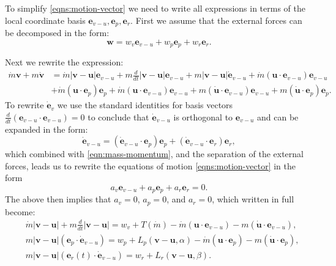 \documentclass{article}
\renewcommand{\vec}[1]{\boldsymbol{#1}}
\begin{document}
To simplify \eqref{eqns:motion-vector} we need to write all expressions in terms of the local coordinate basis $\vec e_{v-u}, \vec e_p, \vec e_r$. First we assume that the external forces can be decomposed in the form:
\[
\vec w = w_v \vec e_{v-u} + w_p \vec e_p + w_r \vec e_r.
\]

Next we rewrite the expression:
\begin{align} \label{eqn:mass-momentum}
    \dot{m}\vec{v} + m \dot{\vec{v}} &= \dot{m}|\vec v -\vec u| \vec e_{v-u} + m \frac{d}{dt}|\vec v- \vec u| \vec e_{v-u} + m |\vec{v}-\vec{u}| \dot{\vec{e}}_{v-u} + \dot{m}(\vec{u} \cdot \vec{e}_{v-u})\vec{e}_{v-u}\\
                                     & +\dot{m}(\vec u \cdot \vec e_p) \vec{e}_p +\dot m (\vec{u} \cdot \vec{e}_{v-u})\vec{e}_{v-u} + m(\dot{\vec{u}}\cdot \vec{e}_{v-u})\vec{e}_{v-u} + m(\dot{\vec{u}}\cdot \vec{e}_{p})\vec{e}_{p} .
\end{align}
To rewrite $\dot{\vec{e}}_v$ we use the standard identities for basis vectors $\frac{d}{dt}(\vec e_{v-u} \cdot \vec e_{v-u})=0$
to conclude that $\dot{\vec{e}}_{v-u}$ is orthogonal to ${\vec{e}}_{v-u}$ and can be expanded in the form:
\[
\dot{\vec{e}}_{v-u} =  (\dot{\vec{e}}_{v-u} \cdot \vec{e}_p)\vec{e}_p + (\dot{\vec{e}}_{v-u} \cdot \vec{e}_r)\vec{e}_r,
\] 
which combined with \eqref{eqn:mass-momentum}, and the separation of the external forces, leads us to rewrite the equations of motion \eqref{eqns:motion-vector} in the form 
\[ 
a_v \vec e_{v-u} + a_p \vec e_p + a_r \vec e_r = 0.
\]
The above then implies that $a_v =0$, $a_p =0$, and $a_r =0$, which written in full become:
\begin{align} \label{eqn:thrust-momentum}
    &  \dot{m} |\vec v- \vec u| + m \frac{d}{dt}|\vec v- \vec u| = w_v + T(\dot{m}) - \dot m (\vec{u} \cdot \vec{e}_{v-u})- m(\dot{\vec{u}}\cdot \vec{e}_{v-u}),
    \\
    \label{eqn:turn-momentum}
    &  m |\vec{v}- \vec{u}|({\vec{e}}_p \cdot \dot{\vec{e}}_{v-u}) = w_p + L_p(\vec{v}-\vec{u},\alpha) - \dot m (\vec{u} \cdot \vec{e}_{p})- m(\dot{\vec{u}}\cdot \vec{e}_{p}),
    \\
    \label{eqn:lift-momentum}
    & m |\vec{v}- \vec{u}|({\vec{e}_r}(t) \cdot \dot{\vec{e}}_{v-u})=w_r +L_r(\vec{v}-\vec{u},\beta).
\end{align}
\end{document}
